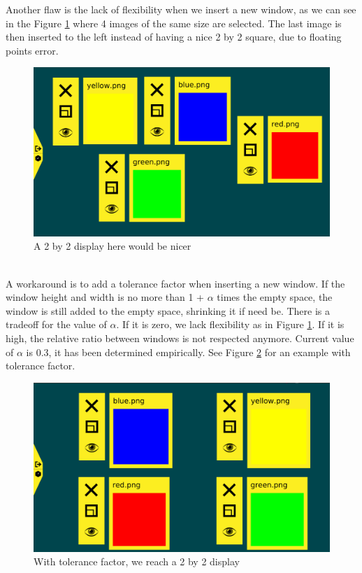 \documentclass{acmtog}
\begin{document}
Another flaw is the lack of flexibility when we insert a new window, as we can see in the Figure \ref{fig:Equalbuggy} where 4 images of the same size are selected. The last image is then inserted to the left instead of having a nice 2 by 2 square, due to floating points error. 
\begin{figure}
  \includegraphics[width=\textwidth]{Images/4-equalbuggyCropped.png}
  \caption{A 2 by 2 display here would be nicer}
  \label{fig:Equalbuggy}
\end{figure}
\\ 
A workaround is to add a tolerance factor when inserting a new window. If the window height and width is no more than 1 + $\alpha$ times the empty space, the window is still added to the empty space, shrinking it if need be. There is a tradeoff for the value of $\alpha$. If it is zero, we lack flexibility as in Figure \ref{fig:Equalbuggy}.
If it is high, the relative ratio between windows is not respected anymore. Current value of $\alpha$ is 0.3, it has been determined empirically. See Figure \ref{fig:Equalright} for an example with tolerance factor.

\begin{figure}
  \includegraphics[width=\textwidth]{Images/4-equalToleranceCropped.png}
  \caption{With tolerance factor, we reach a 2 by 2 display}
  \label{fig:Equalright}
\end{figure}
\end{document}
